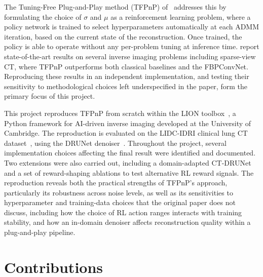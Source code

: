 The Tuning-Free Plug-and-Play method (TFPnP) of~\citet{Wei2022TFPnP} addresses this by formulating the choice of $\sigma$ and $\mu$ as a reinforcement learning problem, where a policy network is trained to select hyperparameters automatically at each ADMM iteration, based on the current state of the reconstruction. Once
trained, the policy is able to operate without any per-problem tuning at inference time. \citet{Wei2022TFPnP} report state-of-the-art results on several inverse imaging problems including sparse-view CT, where TFPnP outperforms both classical baselines and the FBPConvNet. Reproducing these results in an independent implementation, and testing their sensitivity to methodological choices left underspecified in the paper, form the primary focus of this project.

This project reproduces TFPnP from scratch within the LION toolbox~\citep{Biguri2024LION}, a Python framework for AI-driven inverse imaging developed at the University of Cambridge. The reproduction is evaluated on the LIDC-IDRI clinical lung CT dataset~\citep{Armato2011LIDC}, using the DRUNet denoiser~\citep{zhang2021plug}. Throughout the project, several implementation choices affecting the final result were identified and documented. Two extensions were also carried out, including a domain-adapted CT-DRUNet and a set of reward-shaping ablations to test alternative RL reward signals. The reproduction reveals both the practical strengths of TFPnP's approach, particularly its robustness across noise levels, as well as its sensitivities to hyperparameter and training-data choices that the original paper does not discuss, including how the choice of RL action ranges interacts with training stability, and how an in-domain denoiser affects reconstruction quality within a plug-and-play pipeline.

\section{Contributions}
\label{sec:contributions}

